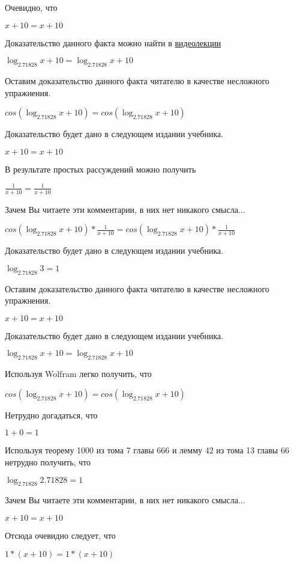 \documentclass[12pt,a4paper,fleqn]{article}
\theoremstyle{definition}
\begin{document}
Очевидно, что 

$ x  +  10  =  x  +  10 $

Доказательство данного факта можно найти в \href{https://www.youtube.com/watch?v=dQw4w9WgXcQ}{видеолекции} 

$\log_{ 2.71828 }{ x  +  10 } = \log_{ 2.71828 }{ x  +  10 }$

Оставим доказательство данного факта читателю в качестве несложного упражнения. 

$cos(\log_{ 2.71828 }{ x  +  10 }) = cos(\log_{ 2.71828 }{ x  +  10 })$

Доказательство будет дано в следующем издании учебника. 

$ x  +  10  =  x  +  10 $

В результате простых рассуждений можно получить 

$\frac{ 1 }{ x  +  10 }
 = \frac{ 1 }{ x  +  10 }
$

Зачем Вы читаете эти комментарии, в них нет никакого смысла... 

$cos(\log_{ 2.71828 }{ x  +  10 }) * \frac{ 1 }{ x  +  10 }
 = cos(\log_{ 2.71828 }{ x  +  10 }) * \frac{ 1 }{ x  +  10 }
$

Доказательство будет дано в следующем издании учебника. 

$\log_{ 2.71828 }{ 3 } =  1 $

Оставим доказательство данного факта читателю в качестве несложного упражнения. 

$ x  +  10  =  x  +  10 $

Доказательство будет дано в следующем издании учебника. 

$\log_{ 2.71828 }{ x  +  10 } = \log_{ 2.71828 }{ x  +  10 }$

Используя Wolfram легко получить, что 

$cos(\log_{ 2.71828 }{ x  +  10 }) = cos(\log_{ 2.71828 }{ x  +  10 })$

Нетрудно догадаться, что 

$ 1  +  0  =  1 $

Используя теорему 1000 из тома 7 главы 666 и лемму 42 из тома 13 главы 66 нетрудно получить, что 

$\log_{ 2.71828 }{ 2.71828 } =  1 $

Зачем Вы читаете эти комментарии, в них нет никакого смысла... 

$ x  +  10  =  x  +  10 $

Отсюда очевидно следует, что 

$ 1  * ( x  +  10 ) =  1  * ( x  +  10 )$
\end{document}
